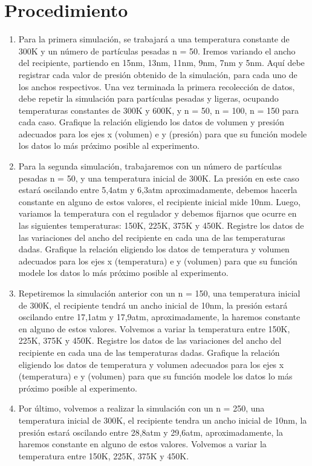 \documentclass[]{article}
\begin{document}
\section{Procedimiento}
\begin{enumerate}
    \item Para la primera simulación, se trabajará a una temperatura constante de 300K y un número de partículas pesadas n = 50. Iremos variando el ancho del recipiente, partiendo en 15nm, 13nm, 11nm,
    9nm, 7nm y 5nm. Aquí debe registrar cada valor de presión obtenido de la simulación, para cada
    uno de los anchos respectivos.
    Una vez terminada la primera recolección de datos, debe repetir la simulación para partículas pesadas y ligeras, ocupando temperaturas constantes de 300K y 600K, y n = 50, n = 100, n = 150
    para cada caso. Grafique la relación eligiendo los datos de volumen y presión adecuados para los 
    ejes x (volumen) e y (presión) para que su función modele los datos lo más próximo posible al 
    experimento.

    \item Para la segunda simulación, trabajaremos con un número de partículas pesadas n = 50, y una
    temperatura inicial de 300K. La presión en este caso estará oscilando entre 5,4atm y 6,3atm
    aproximadamente, debemos hacerla constante en alguno de estos valores, el recipiente inicial mide 10nm. Luego, 
    variamos la temperatura con el regulador y debemos fijarnos que ocurre en las siguientes temperaturas: 
    150K, 225K, 375K y 450K. Registre los datos de las variaciones del ancho del recipiente en cada una de las temperaturas dadas.
    Grafique la relación eligiendo los datos de temperatura y volumen adecuados para los ejes x (temperatura) e y (volumen) para que su función modele los datos lo más 
    próximo posible al experimento.

    \item Repetiremos la simulación anterior con un  n = 150, una temperatura inicial de 300K, el recipiente
    tendrá un ancho inicial de 10nm, la presión estará oscilando entre 17,1atm y 17,9atm, aproximadamente, la haremos constante
    en alguno de estos valores. Volvemos a variar la temperatura entre 150K, 225K, 375K y 450K. Registre los datos de las variaciones 
    del ancho del recipiente en cada una de las temperaturas dadas.
    Grafique la relación eligiendo los datos de temperatura y volumen adecuados para los ejes x (temperatura) e y (volumen) para que 
    su función modele los datos lo más próximo posible al experimento.

    \item  Por último, volvemos a realizar la simulación con un n = 250, una temperatura inicial de 300K, el
    recipiente tendra un ancho inicial de 10nm, la presión estará oscilando entre 28,8atm y 29,6atm,
    aproximadamente, la haremos constante en alguno de estos valores. Volvemos a variar la temperatura entre 
    150K, 225K, 375K y 450K.
    
    
\end{enumerate}
\end{document}
